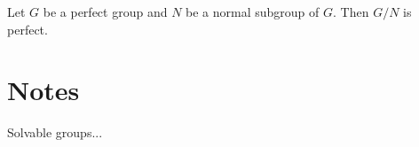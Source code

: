 \begin{prob}
Let $G$ be a perfect group and $N$ be a normal subgroup of $G$. Then $G/N$ is perfect.  	
\end{prob}


\section{Notes}

Solvable groups...


